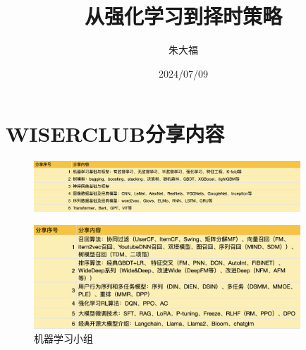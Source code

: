\documentclass[9pt]{beamer}
\title{\songti 从强化学习到择时策略} %
\author{朱大福} %
\institute[School of Economics (SOE)\\
Wang Yanan Institute for Studies in Economic \\ Xiamen University] %
\date{2024/07/09} %
\begin{document}
\songti
\begin{frame}
\titlepage %
\end{frame}
%






\section{WISERCLUB分享内容}
\begin{frame}
\begin{figure}
\centering
\includegraphics[width=10cm]{../fig/上学期.png}
\label{}

\includegraphics[width=10cm]{../fig/下学期.png}
\caption{机器学习小组}

\end{figure}
\end{frame}
\end{document}
